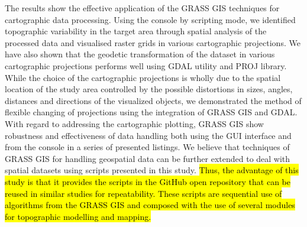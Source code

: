\documentclass[technologies,article,submit,pdftex,moreauthors]{Definitions/mdpi}
\begin{document}
The results show the effective application of the GRASS GIS techniques for cartographic data processing. Using the console by scripting mode, we identified topographic variability in the target area through spatial analysis of the processed data and visualised raster grids in various cartographic projections. We have also shown that the geodetic transformation of the dataset in various cartographic projections performs well using GDAL utility and PROJ library. While the choice of the cartographic projections is wholly due to the spatial location of the study area controlled by the possible distortions in sizes, angles, distances and directions of the visualized objects, we demonstrated the method of flexible changing of projections using the integration of GRASS GIS and GDAL. With regard to addressing the cartographic plotting, GRASS GIS show robustness and effectiveness of data handling both using the GUI interface and from the console in a series of presented listings. We believe that techniques of GRASS GIS for handling geospatial data can be further extended to deal with spatial datasets using scripts presented in this study. \hl{Thus, the advantage of this study is that it provides the scripts in the GitHub open repository that can be reused in similar studies for repeatability. These scripts are sequential use of algorithms from the GRASS GIS and composed with the use of several modules for topographic modelling and mapping.}





\end{document}
